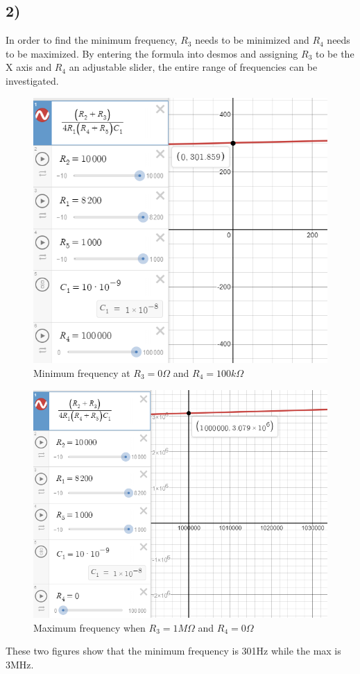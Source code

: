 \documentclass[]{IEEEtran}
\begin{document}
\begin{multicols}{2}
\subsection{2)}
In order to find the minimum frequency, $R_3$ needs to be minimized and $R_4$ needs to be maximized. By entering the formula into desmos and assigning $R_3$ to be the X axis and $R_4$ an adjustable slider, the entire range of frequencies can be investigated.
\begin{figure}[H]
	\centering
	\caption{Minimum frequency at $R_3=0\Omega$ and $R_4=100k\Omega$}
	\label{fig:screenshot001}
	\includegraphics[width=1\linewidth]{screenshot001}
\end{figure}
\begin{figure}[H]
	\centering
	\caption{Maximum frequency when $R_3=1M\Omega$ and $R_4=0\Omega$}
	\label{fig:screenshot002}
	\includegraphics[width=1\linewidth]{screenshot002}
\end{figure}
These two figures show that the minimum frequency is 301Hz while the max is 3MHz.

\end{multicols}
\end{document}

